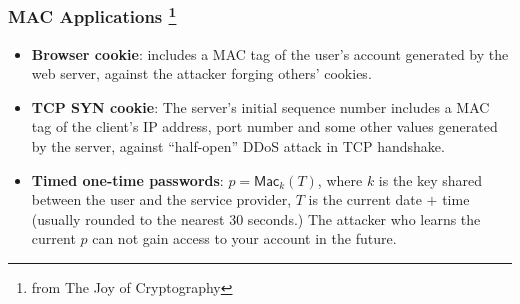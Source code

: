\begin{frame}\frametitle{MAC Applications \footnote{from The Joy of Cryptography}}
\begin{itemize}
\item \textbf{Browser cookie}: includes a MAC tag of the user's account generated by the web server, against the attacker forging others' cookies.
\item \textbf{TCP SYN cookie}: The server's initial sequence number includes a MAC tag of the client's IP address, port number and some other values generated by the server, against ``half-open'' DDoS attack in TCP handshake.
\item \textbf{Timed one-time passwords}: $p=\mathsf{Mac}_k(T)$, where $k$ is the key shared between the user and the service provider, $T$ is the current date $+$ time (usually rounded to the nearest 30 seconds.) The attacker who learns the current $p$ can not gain access to your account in the future.
\end{itemize}
\end{frame}
